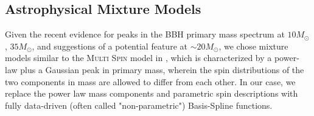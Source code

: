 
\subsection{Astrophysical Mixture Models} \label{sec:astromodels} 

Given the recent evidence for peaks \citep{10.3847/2041-8213/ab3800, 2021ApJ...913L...7A, 2111.03634, 2022ApJ...928..155T,2022ApJ...924..101E, 2022arXiv221012834E,10.48550/arXiv.2302.07289} in the BBH primary mass spectrum at $10 M_{\odot}$, $35 M_{\odot}$, and suggestions of a potential feature at $\sim20 M_{\odot}$, we chose mixture models similar to the \textsc{Multi Spin} model in \cite{2021ApJ...913L...7A}, which is characterized by a power-law plus a Gaussian peak in primary mass, wherein the spin distributions of the two components in mass are allowed to differ from each other. In our case, we replace the power law mass components and parametric spin descriptions with fully data-driven (often called "non-parametric") Basis-Spline functions. 

